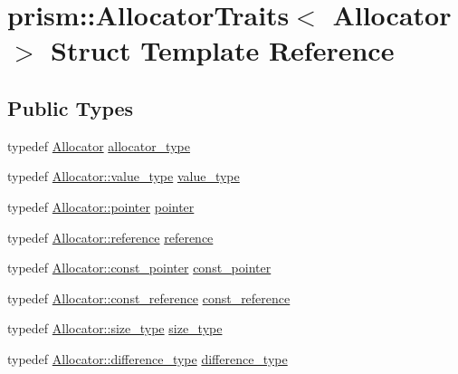 \hypertarget{structprism_1_1_allocator_traits}{}\section{prism\+:\+:Allocator\+Traits$<$ Allocator $>$ Struct Template Reference}
\label{structprism_1_1_allocator_traits}
\subsection*{Public Types}
\begin{DoxyCompactItemize}
\item 
typedef \hyperlink{classprism_1_1_allocator}{Allocator} \hyperlink{structprism_1_1_allocator_traits_a5c6a9e92c53ee13c947265f07e633324}{allocator\+\_\+type}
\item 
typedef \hyperlink{classprism_1_1_allocator_a45426ee64e0aba097a532e0ef5ff5700}{Allocator\+::value\+\_\+type} \hyperlink{structprism_1_1_allocator_traits_ab733362182b9f46d27ca6bdddaa23d67}{value\+\_\+type}
\item 
typedef \hyperlink{classprism_1_1_allocator_ad3c6706a7243bd3ef489e16d34d5750f}{Allocator\+::pointer} \hyperlink{structprism_1_1_allocator_traits_ae6cca8a97ab96e399c40b5774f425d6f}{pointer}
\item 
typedef \hyperlink{classprism_1_1_allocator_a5dde9876d2ed0ca292d8a2019ac2836f}{Allocator\+::reference} \hyperlink{structprism_1_1_allocator_traits_aee67923dfcf22628468bf2faacc31cb3}{reference}
\item 
typedef \hyperlink{classprism_1_1_allocator_af6a4a91dfc203203ecc319a457ce4dce}{Allocator\+::const\+\_\+pointer} \hyperlink{structprism_1_1_allocator_traits_abce8f3352b34f42a7a81bff1b5546b48}{const\+\_\+pointer}
\item 
typedef \hyperlink{classprism_1_1_allocator_a89911899c97ae877a81b798957a2d899}{Allocator\+::const\+\_\+reference} \hyperlink{structprism_1_1_allocator_traits_a136b98e2698754b03398194f80edbf33}{const\+\_\+reference}
\item 
typedef \hyperlink{classprism_1_1_allocator_a47cb9435e4e9ff4c934ea3d4b4338d52}{Allocator\+::size\+\_\+type} \hyperlink{structprism_1_1_allocator_traits_a4de8d85d17a31ddc325c2ac079ea1910}{size\+\_\+type}
\item 
typedef \hyperlink{classprism_1_1_allocator_a39ca38c4c741bbc51d3c6e26603102ef}{Allocator\+::difference\+\_\+type} \hyperlink{structprism_1_1_allocator_traits_ac5e3111044ebe0f5c85c24b0ae9a2875}{difference\+\_\+type}
\end{DoxyCompactItemize}
